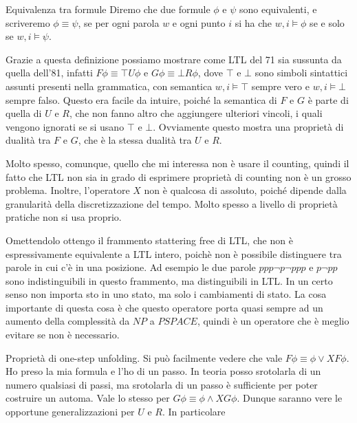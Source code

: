 \begin{definition}{Equivalenza tra formule}
  Diremo che due formule \(\phi\) e \(\psi\) sono equivalenti, e scriveremo \(\phi \equiv \psi\), se per ogni parola \(w\) e ogni punto \(i\) si ha che \(w,i \models \phi\) se e solo se \(w,i \models \psi\).
\end{definition}

Grazie a questa definizione possiamo mostrare come LTL del 71 sia sussunta da quella dell'81, infatti \(F\phi \equiv \top U \phi\) e \(G\phi \equiv \bot R \phi\), dove \(\top\) e \(\bot\) sono simboli sintattici assunti presenti nella grammatica, con semantica \(w,i \models \top\) sempre vero e \(w,i \models \bot\) sempre falso. Questo era facile da intuire, poiché la semantica di \(F\) e \(G\) è parte di quella di \(U\) e \(R\), che non fanno altro che aggiungere ulteriori vincoli, i quali vengono ignorati se si usano \(\top\) e \(\bot\). Ovviamente questo mostra una proprietà di dualità tra \(F\) e \(G\), che è la stessa dualità tra \(U\) e \(R\).

Molto spesso, comunque, quello che mi interessa non è usare il counting, quindi il fatto che LTL non sia in grado di esprimere proprietà di counting non è un grosso problema. Inoltre, l'operatore \(X\) non è qualcosa di assoluto, poiché dipende dalla granularità della discretizzazione del tempo. Molto spesso a livello di proprietà pratiche non si usa proprio.

Omettendolo ottengo il frammento stattering free di LTL, che non è espressivamente equivalente a LTL intero, poichè non è possibile distinguere tra parole in cui c'è  in una posizione. Ad esempio le due parole \(ppp\neg p \neg p pp\) e \(p\neg p p\) sono indistinguibili in questo frammento, ma distinguibili in LTL\@. In un certo senso non importa  sto in uno stato, ma solo i cambiamenti di stato. La cosa importante di questa cosa è che questo operatore porta quasi sempre ad un aumento della complessità da \(NP\) a \(PSPACE\), quindi è un operatore che è meglio evitare se non è necessario.

Proprietà di one-step unfolding. Si può facilmente vedere che vale \(F\phi\equiv \phi \lor X F \phi\). Ho preso la mia formula e l'ho  di un passo. In teoria posso srotolarla di un numero qualsiasi di passi, ma srotolarla di un passo è sufficiente per poter costruire un automa. Vale lo stesso per \(G\phi\equiv\phi\land XG\phi\). Dunque saranno vere le opportune generalizzazioni per \(U\) e \(R\). In particolare

